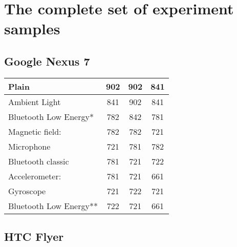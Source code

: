 \section{The complete set of experiment samples}
\subsection{Google Nexus 7}	

\begin{table}[H]
	\centering
    \begin{tabular}{| l | c | c | c |}
    \hline
    Plain                  & 902 & 902 & 841 \\ \hline
    Ambient Light          & 841 & 902 & 841\\ \hline
    Bluetooth Low Energy*  & 782 & 842 & 781 \\ \hline
    Magnetic field:        & 782 & 782 & 721\\ \hline
    Microphone             & 721 & 781 & 782 \\ \hline
    Bluetooth classic      & 781 & 721 & 722 \\ \hline
    Accelerometer:         & 781 & 721 & 661 \\ \hline
    Gyroscope              & 721 & 722 & 721 \\ \hline
    Bluetooth Low Energy** & 722 & 721 & 661 \\ \hline
    \end{tabular}
\end{table}

\subsection{HTC Flyer}	

